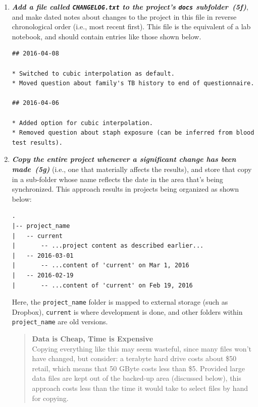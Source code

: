 \documentclass[10pt,letterpaper]{article}
\newcommand{\practice}[2]{\textbf{\emph{{#2}~({#1})}}}
\begin{document}
\begin{enumerate}

\item

  \practice{5f}{Add a file called \texttt{CHANGELOG.txt} to the
  project's \texttt{docs} subfolder}, and make dated notes about
  changes to the project in this file in reverse chronological order
  (i.e., most recent first). This file is the equivalent of a lab
  notebook, and should contain entries like those shown below.

{\small
\begin{verbatim}
## 2016-04-08

* Switched to cubic interpolation as default.
* Moved question about family's TB history to end of questionnaire.

## 2016-04-06

* Added option for cubic interpolation.
* Removed question about staph exposure (can be inferred from blood test results).
\end{verbatim}
}

\item

  \practice{5g}{Copy the entire project whenever a significant change
  has been made} (i.e., one that materially affects the results),
  and store that copy in a sub-folder whose name reflects the date in
  the area that's being synchronized. This approach results in
  projects being organized as shown below:

{\small
\begin{verbatim}
.
|-- project_name
|   -- current
|       -- ...project content as described earlier...
|   -- 2016-03-01
|       -- ...content of 'current' on Mar 1, 2016
|   -- 2016-02-19
|       -- ...content of 'current' on Feb 19, 2016
\end{verbatim}
}

  Here, the \texttt{project\_name} folder is mapped to external
  storage (such as Dropbox), \texttt{current} is where development is
  done, and other folders within \texttt{project\_name} are old
  versions.

  \begin{quote}
    \noindent \textbf{Data is Cheap, Time is Expensive}
    \\
    Copying everything like this may seem wasteful, since many files
    won't have changed, but consider: a terabyte hard drive costs
    about \$50 retail, which means that 50 GByte costs less than
    \$5. Provided large data files are kept out of the backed-up area
    (discussed below), this approach costs less than the time it would
    take to select files by hand for copying.
  \end{quote}

\end{enumerate}
\end{document}
